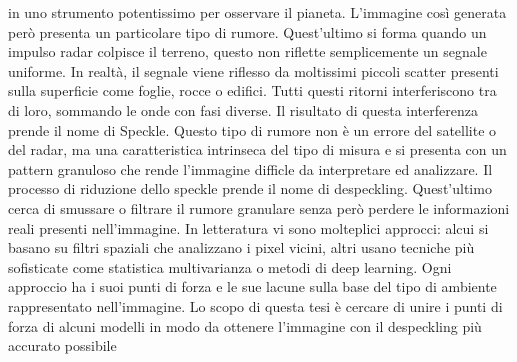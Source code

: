 in uno strumento potentissimo per osservare il pianeta. L'immagine così generata però presenta un 
particolare tipo di rumore. Quest'ultimo si forma quando un impulso radar colpisce il terreno, 
questo non riflette semplicemente un segnale uniforme. In realtà, il segnale viene riflesso da 
moltissimi piccoli scatter presenti sulla superficie come foglie, rocce o edifici. Tutti questi 
ritorni interferiscono tra di loro, sommando le onde con fasi diverse. Il risultato di questa 
interferenza prende il nome di Speckle. Questo tipo di rumore non è un errore del satellite o 
del radar, ma una caratteristica intrinseca del tipo di misura e si presenta con un pattern granuloso
che rende l'immagine difficle da interpretare ed analizzare. Il processo di riduzione dello speckle 
prende il nome di despeckling. Quest'ultimo cerca di smussare o filtrare il rumore granulare senza 
però perdere le informazioni reali presenti nell'immagine. In letteratura vi sono molteplici 
approcci: alcui si basano su filtri spaziali che analizzano i pixel vicini, altri usano tecniche 
più sofisticate come statistica multivarianza o metodi di deep learning. Ogni approccio ha i suoi
punti di forza e le sue lacune sulla base del tipo di ambiente rappresentato nell'immagine. Lo scopo
di questa tesi è cercare di unire i punti di forza di alcuni modelli in modo da ottenere l'immagine 
con il despeckling più accurato possibile
\medskip

